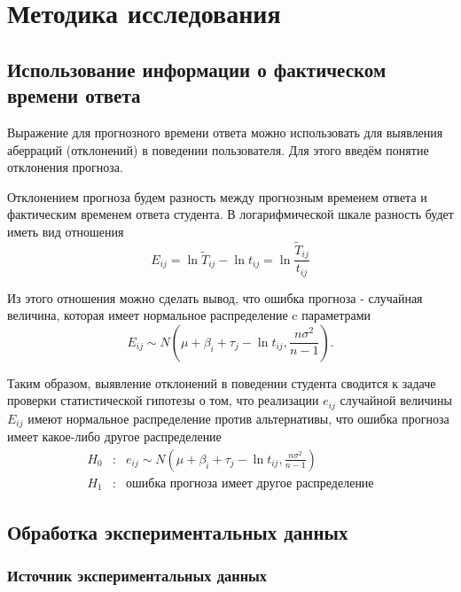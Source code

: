  \chapter{Методика исследования}

 \section{Использование информации о фактическом времени ответа}

Выражение для прогнозного времени ответа можно использовать для выявления абер\-раций (отклонений) в поведении пользователя. Для этого введём понятие отклонения прогноза.

Отклонением прогноза будем разность между прогнозным временем ответа и фактичес\-ким временем ответа студента. В логарифмической шкале разность будет иметь вид отноше\-ния
\begin{equation}
E_{ij} = \ln \tilde{T}_{ij} - \ln t_{ij} =  \ln \frac{\tilde{T}_{ij}}{t_{ij}}
\end{equation}

Из этого отношения можно сделать вывод, что ошибка прогноза - случайная величина, которая имеет нормальное распределение c параметрами
\begin{equation}
E_{ij} \sim N\left(\mu + \beta_i + \tau_j - \ln t_{ij},\frac{n\sigma^2}{n-1}\right).
\end{equation}

Таким образом, выявление отклонений в поведении студента сводится к задаче проверки статистической гипотезы о том, что реализации $e_{ij}$ случайной величины $E_{ij}$ имеют нормаль\-ное распределение против альтернативы, что ошибка прогноза имеет какое-либо другое распреде\-ление
$$
\begin{array}{lll}
H_0 &:& e_{ij} \sim N\left(\mu + \beta_i + \tau_j - \ln t_{ij},\frac{n\sigma^2}{n-1}\right)\\
H_1 &:& \mbox{ошибка прогноза имеет другое распределение}
\end{array}
$$

\section{Обработка экспериментальных данных}

\subsection{Источник экспериментальных данных}

